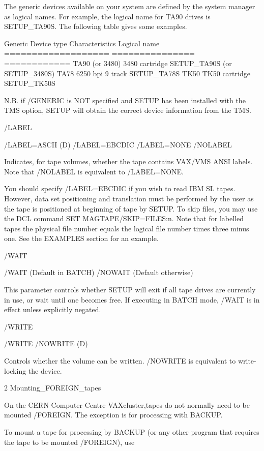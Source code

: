 \begin{XMP}
 The generic devices available on your system are defined by the system
 manager as logical names. For example, the logical name for TA90 drives
 is SETUP_TA90S. The following table gives some examples.

 Generic Device type     Characteristics     Logical name
 ===================     ===============     ============
 TA90 (or 3480)          3480 cartridge      SETUP_TA90S (or SETUP_3480S)
 TA78                    6250 bpi 9 track    SETUP_TA78S
 TK50                    TK50 cartridge      SETUP_TK50S

 N.B. if /GENERIC is NOT specified and SETUP has been installed with
 the TMS option, SETUP will obtain the correct device information from
 the TMS.

/LABEL

   /LABEL=ASCII  (D)
   /LABEL=EBCDIC
   /LABEL=NONE
   /NOLABEL

 Indicates, for tape volumes, whether the  tape  contains  VAX/VMS
 ANSI labels.  Note that /NOLABEL is equivalent to /LABEL=NONE.

 You should specify /LABEL=EBCDIC if you wish to read IBM SL tapes.
 However, data set positioning and translation must be performed by
 the user as the tape is positioned at beginning of tape by SETUP.
 To skip files, you may use the DCL command SET MAGTAPE/SKIP=FILES:n.
 Note that for labelled tapes the physical file number equals the
 logical file number times three minus one. See the EXAMPLES section
 for an example.

/WAIT

   /WAIT     (Default in BATCH)
   /NOWAIT   (Default otherwise)

  This parameter controls whether SETUP will exit if all tape drives
  are currently in use, or wait until one becomes free. If executing
  in BATCH mode, /WAIT is in effect unless explicitly negated.

/WRITE

   /WRITE
   /NOWRITE  (D)

 Controls   whether  the  volume  can  be  written.   /NOWRITE  is
 equivalent to write-locking the device.

2 Mounting_FOREIGN_tapes

On the CERN Computer Centre VAXcluster,tapes do not normally need
to be mounted /FOREIGN. The exception is for processing with BACKUP.

To mount a tape for processing by BACKUP (or any other program that
requires the tape to be mounted /FOREIGN), use


\end{XMP}
